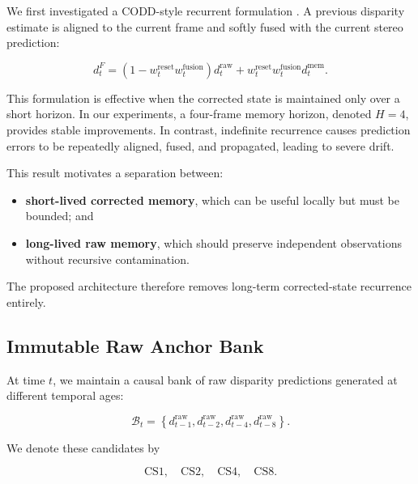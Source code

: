 \documentclass[11pt,a4paper]{article}
\begin{document}
We first investigated a CODD-style recurrent formulation
\cite{li2023codd}.
A previous disparity estimate is aligned to the current frame and softly
fused with the current stereo prediction:

\begin{equation}
d_t^{F}
=
\left(
1-w_t^{\mathrm{reset}}w_t^{\mathrm{fusion}}
\right)d_t^{\mathrm{raw}}
+
w_t^{\mathrm{reset}}w_t^{\mathrm{fusion}}
d_t^{\mathrm{mem}}.
\label{eq:codd_bounded}
\end{equation}

This formulation is effective when the corrected state is maintained
only over a short horizon.
In our experiments, a four-frame memory horizon, denoted \(H=4\),
provides stable improvements.
In contrast, indefinite recurrence causes prediction errors to be
repeatedly aligned, fused, and propagated, leading to severe drift.

This result motivates a separation between:

\begin{itemize}
    \item \textbf{short-lived corrected memory}, which can be useful
    locally but must be bounded; and
    \item \textbf{long-lived raw memory}, which should preserve
    independent observations without recursive contamination.
\end{itemize}

The proposed architecture therefore removes long-term corrected-state
recurrence entirely.

\subsection{Immutable Raw Anchor Bank}
\label{sec:anchor_bank}

At time \(t\), we maintain a causal bank of raw disparity predictions
generated at different temporal ages:

\begin{equation}
\mathcal{B}_t
=
\left\{
d_{t-1}^{\mathrm{raw}},
d_{t-2}^{\mathrm{raw}},
d_{t-4}^{\mathrm{raw}},
d_{t-8}^{\mathrm{raw}}
\right\}.
\label{eq:raw_bank}
\end{equation}

We denote these candidates by

\begin{equation}
\mathrm{CS1},\quad
\mathrm{CS2},\quad
\mathrm{CS4},\quad
\mathrm{CS8}.
\end{equation}
\end{document}
